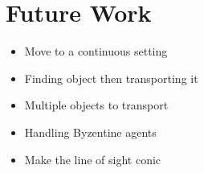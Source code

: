 \documentclass[12pt]{article}
\begin{document}
\section{Future Work}
\begin{itemize}
\item Move to a continuous setting
\item Finding object then transporting it
\item Multiple objects to transport
\item Handling Byzentine agents
\item Make the line of sight conic
\end{itemize}




\end{document}
